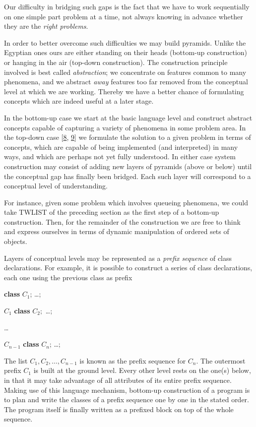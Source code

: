 \documentclass[twoside,11pt]{book}
\begin{document}
Our difficulty in bridging such gaps is the fact that we have to work sequentially on one simple part problem at a time, not always knowing in advance whether they are the \textit{right problems}.

In order to better overcome such difficulties we may build pyramids. Unlike the Egyptian ones ours are either standing on their heads (bottom-up construction) or hanging in the air (top-down construction). The construction principle involved is best called \textit{abstraction}; we concentrate on features common to many phenomena, and we abstract \textit{away} features too far removed from the conceptual level at which we are working. Thereby we have a better chance of formulating concepts which are indeed useful at a later stage.

In the bottom-up case we start at the basic language level and construct abstract concepts capable of capturing a variety of phenomena in some problem area. In the top-down case [\hyperref[ref:8]{8}, \hyperref[ref:9]{9}] we formulate the solution to a given problem in terms of concepts, which are capable of being implemented (and interpreted) in many ways, and which are perhaps not yet fully understood. In either case system construction may consist of adding new layers of pyramids (above or below) until the conceptual gap has finally been bridged. Each such layer will correspond to a conceptual level of understanding.

For instance, given some problem which involves queueing phenomena, we could take TWLIST of the preceding section as the first step of a bottom-up construction. Then, for the remainder of the construction we are free to think and express ourselves in terms of dynamic manipulation of ordered sets of 
objects.

Layers of conceptual levels may be represented as a \textit{prefix sequence} of class declarations. For example, it is possible to construct a series of class declarations, each one using the previous class as prefix

\hfill\textbf{class} $C_1$; \dots;\hspace{14em}

\hfill $C_1$ \textbf{class} $C_2;$ \dots;\hspace{14em}

\tabto*{13em}\dots

\hfill $C_{n - 1}$ \textbf{class} $C_n$; \dots;\hspace{14em}

\noindent
The list $C_1, C_2, \dots, C_{n-1}$ is known as the prefix sequence for $C_n$. The outermost prefix $C_1$ is built at the ground level. Every other level rests on the one(s) below, in that it may take advantage of all attributes of its entire prefix sequence. Making use of this language mechanism, bottom-up construction of a program is to plan and write the classes of a prefix sequence one by one in the stated order. The program itself is finally written as a prefixed block on top of the whole sequence.
\end{document}
